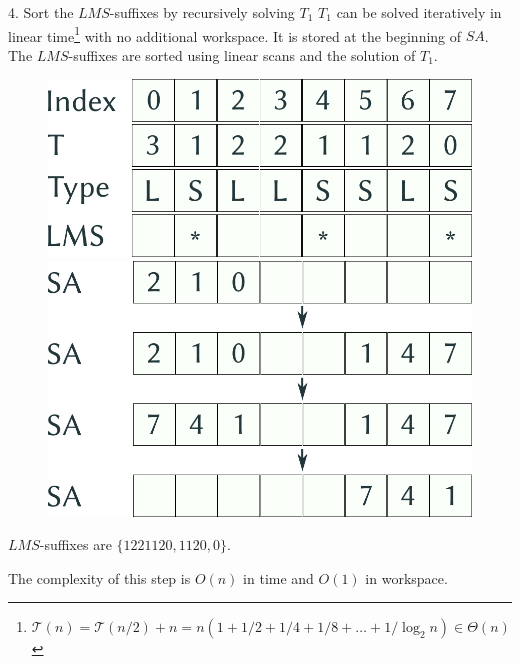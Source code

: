 \documentclass{beamer}
\begin{document}
  \begin{frame}{4. Sort the $LMS$-suffixes by recursively solving $T_1$}
    $T_1$ can be solved iteratively in linear time\footnote{$\mathcal{T}(n) = \mathcal{T}(n/2) + n = n(1 + 1/2 + 1/4 + 1/8 + \dots + 1/\log_2 n ) \in \Theta(n)$} with no additional workspace. It is stored at the beginning of $SA$. The $LMS$-suffixes are sorted using linear scans and the solution of $T_1$.

    \begin{figure}
      \centering
      \begin{minipage}{.5\textwidth}
        \centering
        \includegraphics[width=.9\linewidth]{img/preliminary.pdf}
      \end{minipage}%
      \begin{minipage}{.5\textwidth}
        \centering
        \includegraphics[width=.9\linewidth]{img/SA_4.pdf}
      \end{minipage}
    \end{figure}

    $LMS$-suffixes are $\{ 1221120, 1120, 0 \}$.

    The complexity of this step is $O(n)$ in time and $O(1)$ in workspace.
    \vspace{1pt}

  \end{frame}
\end{document}
